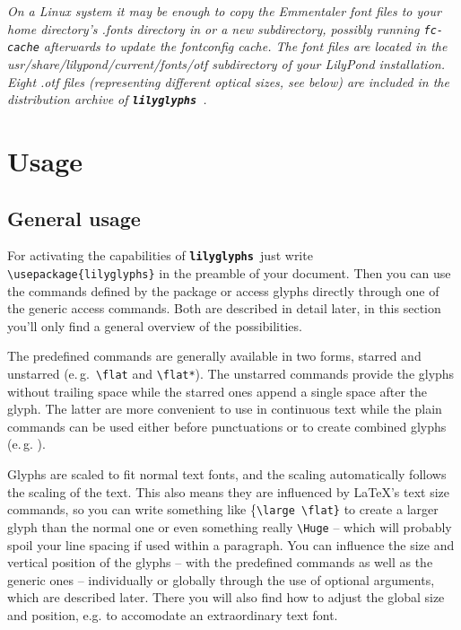 \documentclass{article}
\newcommand{\lilyglyphs}{\texttt{\textbf{lilyglyphs\,}}}
\newcommand*{\cmd}[1]{\texttt{\textbackslash #1}}
\begin{document}
\textit{On a Linux system it may be enough to copy the Emmentaler font files to your home directory's .fonts directory in or a new subdirectory, possibly running \texttt{fc-cache} afterwards to update the fontconfig cache. 
The font files are located in the usr/share/lilypond/current/fonts/otf subdirectory of your LilyPond installation. 
Eight .otf files (representing different optical sizes, see below) are included in the distribution archive of \lilyglyphs.}



\section{Usage}
\subsection{General usage}
For activating the capabilities of \lilyglyphs just write \cmd{usepackage\{lilyglyphs\}} in the preamble of your document. 
Then you can use the commands defined by the package or access glyphs directly through one of the generic access commands.
Both are described in detail later, in this section you'll only find a general overview of the possibilities.

The predefined commands are generally available in two forms, starred and unstarred (e.\,g.\ \cmd{flat} and \cmd{flat*}). 
The unstarred commands provide the glyphs without trailing space while the starred ones append a single space after the glyph. 
The latter are more convenient to use in continuous text while the plain commands can be used either before punctuations or to create combined glyphs (e.\,g. ).

Glyphs are scaled to fit normal text fonts, and the scaling automatically follows the scaling of the text. 
This also means they are influenced by \LaTeX 's text size commands, so you can write something like \{\cmd{large \textbackslash flat\}} to create a larger {\large \flat} glyph than the normal \flat* one or even something really \cmd{Huge} {\Huge {}} -- which will probably spoil your line spacing if used within a paragraph. 
You can influence the size and vertical position of the glyphs -- with the predefined commands as well as the generic ones -- individually or globally through the use of optional arguments, which are described later.
There you will also find how to adjust the global size and position, e.g. to accomodate an extraordinary text font.
\end{document}
